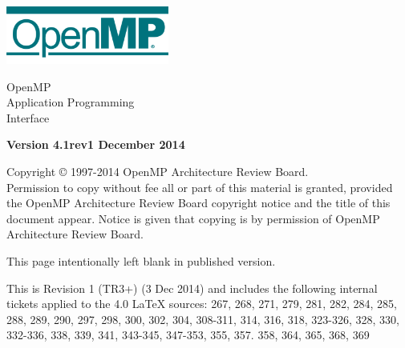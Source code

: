 
  \begin{titlepage}
    \begin{flushleft}
     \hspace{-6em} \includegraphics[width=0.4\textwidth]{openmp-logo.png}
    \end{flushleft}

    \begin{adjustwidth}{-0.75in}{0in}
    \begin{center}
      \Huge
      \textsf{OpenMP\\Application Programming\\Interface}

      \vspace{0.5in}\textsf{    }\vspace{-0.7in}
      \normalsize

      \vspace{1.0in}

      \textbf{Version 4.1rev1 December 2014}
    \end{center}
    \end{adjustwidth}

    \vspace{3.0in}

\begin{adjustwidth}{0pt}{1em}\setlength{\parskip}{0.25\baselineskip}%
Copyright © 1997-2014 OpenMP Architecture Review Board.\\
Permission to copy without fee all or part of this material is granted,
provided the OpenMP Architecture Review Board copyright notice and
the title of this document appear. Notice is given that copying is by
permission of OpenMP Architecture Review Board.\end{adjustwidth}

  \end{titlepage}


\clearpage
\thispagestyle{empty}
\phantom{a}
This page intentionally left blank in published version.

This is Revision 1 (TR3+) (3 Dec 2014) and includes the following internal tickets applied to the 4.0 LaTeX sources:
267, 268, 271, 279, 281, 282, 284, 285, 288, 289, 290, 297, 298, 300, 302, 304, 308-311, 314, 316, 318, 323-326, 328, 330, 332-336, 338, 339, 341, 343-345, 347-353, 355, 357. 358, 364, 365, 368, 369 


\vfill


